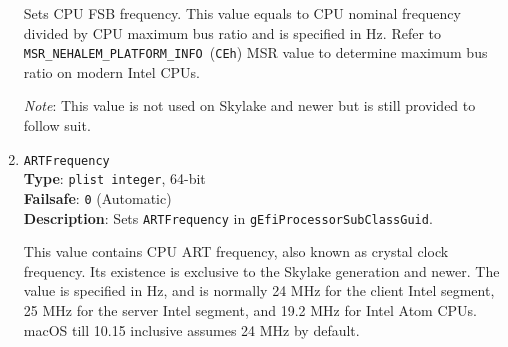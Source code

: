 \documentclass[]{article}
\begin{document}
\begin{enumerate}
  Sets CPU FSB frequency. This value equals to CPU nominal frequency divided
  by CPU maximum bus ratio and is specified in Hz. Refer to
  \texttt{MSR\_NEHALEM\_PLATFORM\_INFO}~(\texttt{CEh}) MSR value to determine
  maximum bus ratio on modern Intel CPUs.

  \emph{Note}: This value is not used on Skylake and newer but is still provided
  to follow suit.
\item
  \texttt{ARTFrequency}\\
  \textbf{Type}: \texttt{plist\ integer}, 64-bit\\
  \textbf{Failsafe}: \texttt{0} (Automatic)\\
  \textbf{Description}: Sets \texttt{ARTFrequency} in
  \texttt{gEfiProcessorSubClassGuid}.

  This value contains CPU ART frequency, also known as crystal clock frequency.
  Its existence is exclusive to the Skylake generation and newer. The value is specified
  in Hz, and is normally 24 MHz for the client Intel segment, 25 MHz for the server Intel segment,
  and 19.2 MHz for Intel Atom CPUs. macOS till 10.15 inclusive assumes 24 MHz by default.


\end{enumerate}
\end{document}
